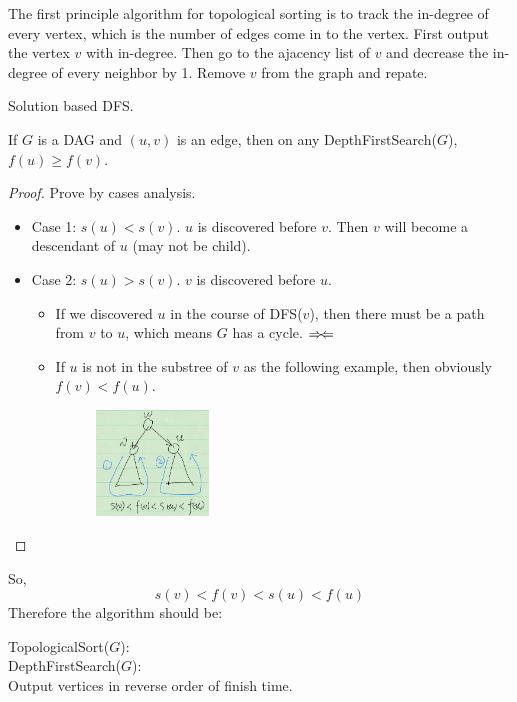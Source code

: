 \documentclass[en,hazy,blue,screen,14pt]{elegantnote}
\newcommand\tab[1][1cm]{\hspace*{#1}}
\begin{document}
The first principle algorithm for topological sorting is to track the in-degree 
of every vertex, which is the number of edges come in to the vertex. First 
output the vertex $v$ with in-degree. Then go to the ajacency list of $v$ and 
decrease the in-degree of every neighbor by 1. Remove $v$ from the graph and 
repate.

Solution based DFS.
\begin{theorem}
 If $G$ is a DAG and $(u, v)$ is an edge, then on any DepthFirstSearch($G$), 
$f(u) \ge f(v)$.
\end{theorem}

\begin{proof}
Prove by cases analysis.
 \begin{itemize}
  \item Case 1: $s(u) < s(v)$. $u$ is discovered before $v$. Then $v$ will 
become a descendant of $u$ (may not be child).
  \item Case 2: $s(u) > s(v)$. $v$ is discovered before $u$. 
  \begin{itemize}
   \item If we discovered $u$ in the course of DFS($v$), then there must be 
a path from $v$ to $u$, which means $G$ has a cycle. 
$\Rightarrow\mskip-\thinmuskip\Leftarrow$
    \item If $u$ is not in the substree of $v$ as the following example, 
then obviously $f(v) < f(u)$.
        \begin{figure}[H]
        \centering
        \includegraphics[width=0.3\textwidth]{dfs-s-f.png}
        \end{figure}
  \end{itemize}
 \end{itemize}
\end{proof}

So, \[s(v) < f(v) < s(u) < f(u)\]
Therefore the algorithm should be:

TopologicalSort($G$):\\
\tab\tab DepthFirstSearch($G$):\\
\tab\tab\tab\tab Output vertices in reverse order of finish time.
\end{document}
